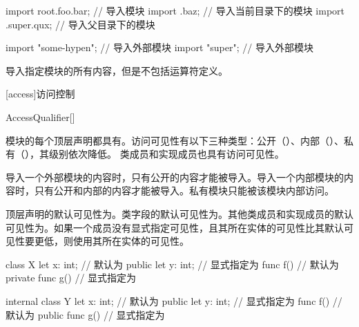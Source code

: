 \enterexample
\begin{codeblock}
import root.foo.bar; // 导入模块
import .baz; // 导入当前目录下的模块
import .super.qux; // 导入父目录下的模块

import "some-hypen"; // 导入外部模块
import "super"; // 导入外部模块
\end{codeblock}
\exitexample

\pnum
\tcode{*}导入指定模块的所有内容，但是不包括运算符定义。

[access]{访问控制}

\begin{bnf}{AccessQualifier}[\oneof]
\end{bnf}

\pnum
模块的每个顶层声明都具有。访问可见性有以下三种类型：公开（）、内部（）、私有（），其级别依次降低。
类成员和实现成员也具有访问可见性。

\pnum
导入一个外部模块的内容时，只有公开的内容才能被导入。导入一个内部模块的内容时，只有公开和内部的内容才能被导入。私有模块只能被该模块内部访问。

\pnum
顶层声明的默认可见性为。类字段的默认可见性为。其他类成员和实现成员的默认可见性为。如果一个成员没有显式指定可见性，且其所在实体的可见性比其默认可见性要更低，则使用其所在实体的可见性。

\enterexample
\begin{codeblock}
class X {
    let x: int; // 默认为
    public let y: int; // 显式指定为
    func f() {} // 默认为
    private func g() {} // 显式指定为
}

internal class Y {
    let x: int; // 默认为
    public let y: int; // 显式指定为
    func f() {} // 默认为
    public func g() {} // 显式指定为
}
\end{codeblock}